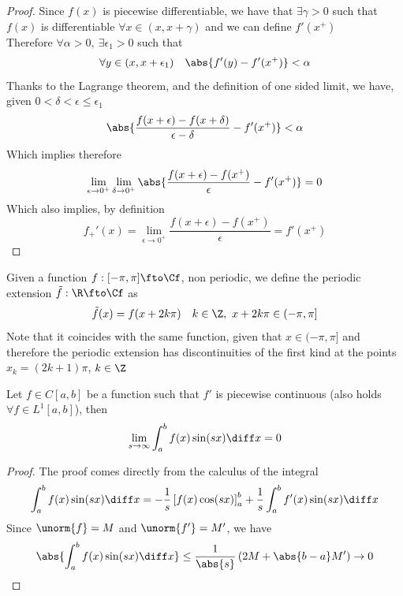 \documentclass[../mmf.tex]{subfiles}
\begin{document}
\begin{proof}
	Since $f(x)$ is piecewise differentiable, we have that $\exists\gamma>0$ such that $f(x)$ is differentiable $\forall x\in(x,x+\gamma)$ and we can define $f'\left( x^+ \right)$\\
	Therefore $\forall\alpha>0,\ \exists\epsilon_1>0$ such that
	\begin{equation*}
		\forall y\in(x,x+\epsilon_1)\quad\abs{f'(y)-f'(x^+)}<\alpha
	\end{equation*}
	Thanks to the Lagrange theorem, and the definition of one sided limit, we have, given $0<\delta<\epsilon\le\epsilon_1$
	\begin{equation*}
		\abs{\frac{f(x+\epsilon)-f(x+\delta)}{\epsilon-\delta}-f'(x^+)}<\alpha
	\end{equation*}
	Which implies therefore
	\begin{equation*}
		\lim_{\epsilon\to0^+}\lim_{\delta\to0^+}\abs{\frac{f(x+\epsilon)-f(x^+)}{\epsilon}-f'(x^+)}=0
	\end{equation*}
	Which also implies, by definition
	\begin{equation*}
		f_+'(x)=\lim_{\epsilon\to0^+}\frac{f(x+\epsilon)-f(x^+)}{\epsilon}=f'(x^+)
	\end{equation*}
\end{proof}
\begin{dfn}
	Given a function $f:[-\pi,\pi]\fto\Cf$, non periodic, we define the periodic extension $\tilde{f}:\R\fto\Cf$ as
	\begin{equation*}
		\tilde{f}(x)=f(x+2k\pi)\quad k\in\Z,\ x+2k\pi\in(-\pi,\pi]
	\end{equation*}
	Note that it coincides with the same function, given that $x\in(-\pi,\pi]$ and therefore the periodic extension has discontinuities of the first kind at the points $x_k=(2k+1)\pi$, $k\in\Z$
\end{dfn}
\begin{lem}
	Let $f\in C[a,b]$ be a function such that $f'$ is piecewise continuous (also holds $\forall f\in L^1[a,b]$), then
	\begin{equation*}
		\lim_{s\to\infty}\int_{a}^{b}f(x)\sin(sx)\diff x=0
	\end{equation*}
\end{lem}
\begin{proof}
	The proof comes directly from the calculus of the integral
	\begin{equation*}
		\int_{a}^{b}f(x)\sin(sx)\diff x=-\frac{1}{s}\left[ f(x)\cos(sx) \right]^b_a+\frac{1}{s}\int_{a}^{b}f'(x)\sin(sx)\diff x
	\end{equation*}
	Since $\unorm{f}=M$ and $\unorm{f'}=M'$, we have
	\begin{equation*}
		\abs{\int_{a}^{b}f(x)\sin(sx)\diff x}\le\frac{1}{\abs{s}}\left( 2M+\abs{b-a}M' \right)\to0
	\end{equation*}
\end{proof}
\end{document}
